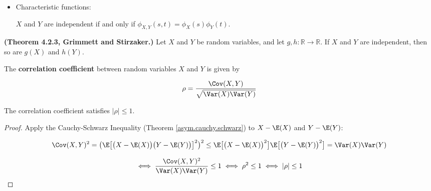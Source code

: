 \begin{itemize}
\begin{proof}
\[
\int \int_{A} f_{X_1, Y_1} (x,y) dx dy = \int \int_{B} f_{X_1, Y_1} \big( S(x,y) \big) \left| J(x, y) \right| dx dy
\]

where \(A \subseteq \text{domain}(f_{X_1, Y_1}(\cdot))\), \(B\) is the transformation of the region \(A\) under \(S\), and \(|J(x,y)|\) is the Jacobian of \(S\) at \((x,y)\). It follows from the definition of joint pdfs that the integrand on the right is the joint pdf of \((X_2, Y_2)\); that is,

\[
f_{X_2, Y_2}(x,y) =  f_{X_1, Y_1} \big( S(x,y) \big) \left| J(x, y) \right| .
\]

\end{proof}






\item Characteristic functions: \begin{theorem}\(X\) and \(Y\) are independent if and only if \(\phi_{X,Y}(s,t) = \phi_X(s) \phi_Y(t)\).\end{theorem}

\end{itemize}

\begin{theorem} \textbf{(Theorem 4.2.3, Grimmett and Stirzaker.)} Let \(X\) and \(Y\) be random variables, and let \(g, h: \mathbb{R} \to \mathbb{R}\). If \(X\) and \(Y\) are independent, then so are \(g(X)\) and \(h(Y)\). \end{theorem}

\begin{definition}The \textbf{correlation coefficient} between random variables \(X\) and \(Y\) is given by

\[
\rho = \frac{\Cov(X,Y)}{\sqrt{\Var(X) \Var(Y)}}
\]
\end{definition}

\begin{theorem}The correlation coefficient satisfies \(|\rho| \leq 1\).\end{theorem}

\begin{proof}
Apply the Cauchy-Schwarz Inequality (Theorem \ref{asym.cauchy.schwarz})  to \(X - \E(X)\) and \(Y - \E(Y)\):

\[
\Cov(X,Y)^2 = \big(\E\big[\big(X - \E(X) \big) \big(Y - \E(Y) \big) \big]^2\big)^2 \leq \E \big[\big(X - \E(X) \big)^2 \big]\E \big[ \big(Y - \E(Y) \big) ^2\big] = \Var(X) \Var(Y) 
\]

\[
\iff \frac{\Cov(X,Y)^2}{\Var(X) \Var(Y) } \leq 1 \iff \rho^2 \leq 1 \iff |\rho| \leq 1
\]

\end{proof}

